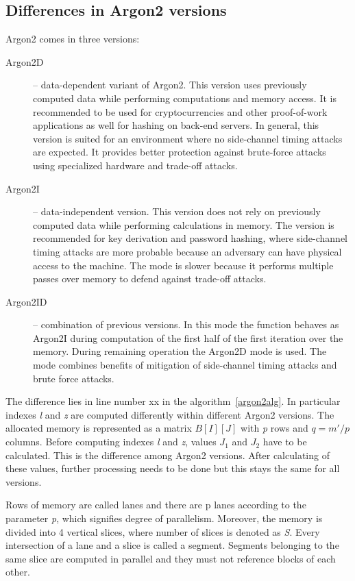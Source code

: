 \documentclass[nolof]{fithesis3}
\begin{document}
\subsection{Differences in Argon2 versions}
\label{argon2versions}
Argon2 comes in three versions:

\begin{description}
\item[Argon2D] -- data-dependent variant of Argon2. This version uses previously computed data while performing computations and memory access. It is recommended to be used for cryptocurrencies and other proof-of-work applications as well for hashing on back-end servers. In general, this version is suited for an environment where no side-channel timing attacks are expected. It provides better protection against brute-force attacks using specialized hardware and trade-off attacks.

\item[Argon2I] -- data-independent version. This version does not rely on previously computed data while performing calculations in memory. The version is recommended for key derivation and password hashing, where side-channel timing attacks are more probable because an adversary can have physical access to the machine. The mode is slower because it performs multiple passes over memory to defend against trade-off attacks.

\item[Argon2ID] -- combination of previous versions. In this mode the function behaves as Argon2I during computation of the first half of the first iteration over the memory. During remaining operation the Argon2D mode is used. The mode combines benefits of mitigation of side-channel timing attacks and brute force attacks.
\end{description}

The difference lies in line number xx in the algorithm~\ref{argon2alg}. In particular indexes \emph{l} and \emph{z} are computed differently within different Argon2 versions. The allocated memory is represented as a matrix \(B[I][J]\) with \emph{p} rows and \(q = m' / p\) columns. Before computing indexes \emph{l} and \emph{z}, values \(J_1\) and \(J_2\) have to be calculated. This is the difference among Argon2 versions. After calculating of these values, further processing needs to be done but this stays the same for all versions.

Rows of memory are called lanes and there are p lanes according to the parameter \emph{p}, which signifies degree of parallelism. Moreover, the memory is divided into 4 vertical slices, where number of slices is denoted as \emph{S}. Every intersection of a lane and a slice is called a segment. Segments belonging to the same slice are computed in parallel and they must not reference blocks of each other.
\end{document}
